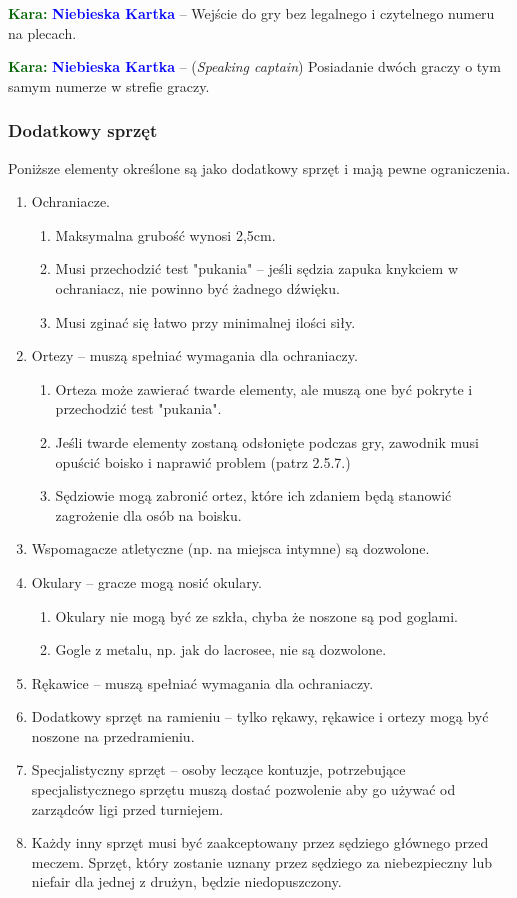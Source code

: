 \documentclass[11pt,a4paper]{article}
\newcommand\bluecard[1]{\bgroup\textcolor{darkgreen}{\textbf{Kara: }}\bgroup\textcolor{blue}{\textbf{Niebieska Kartka}} -- #1}
\begin{document}
\bluecard{Wejście do gry bez legalnego i czytelnego numeru na plecach.}

\bluecard{(\emph{Speaking captain}) Posiadanie dwóch graczy o tym samym numerze w strefie graczy.}

\subsubsection{Dodatkowy sprzęt}
Poniższe elementy określone są jako dodatkowy sprzęt i mają pewne ograniczenia.
\begin{enumerate}
  \item Ochraniacze.
  \begin{enumerate}
    \item Maksymalna grubość wynosi 2,5cm.
    \item Musi przechodzić test "pukania" -- jeśli sędzia zapuka knykciem w ochraniacz, nie powinno być żadnego dźwięku.
    \item Musi zginać się łatwo przy minimalnej ilości siły.
  \end{enumerate}
  \item Ortezy -- muszą spełniać wymagania dla ochraniaczy.
  \begin{enumerate}
    \item Orteza może zawierać twarde elementy, ale muszą one być pokryte i przechodzić test "pukania".
    \item Jeśli twarde elementy zostaną odsłonięte podczas gry, zawodnik musi opuścić boisko i naprawić problem (patrz 2.5.7.) %
    \item Sędziowie mogą zabronić ortez, które ich zdaniem będą stanowić zagrożenie dla osób na boisku.
  \end{enumerate}
  \item Wspomagacze atletyczne (np. na miejsca intymne) są dozwolone.
  \item Okulary -- gracze mogą nosić okulary.
  \begin{enumerate}
    \item Okulary nie mogą być ze szkła, chyba że noszone są pod goglami.
    \item Gogle z metalu, np. jak do lacrosee, nie są dozwolone.
  \end{enumerate}
  \item Rękawice -- muszą spełniać wymagania dla ochraniaczy.
  \item Dodatkowy sprzęt na ramieniu -- tylko rękawy, rękawice i ortezy mogą być noszone na przedramieniu.
  \item Specjalistyczny sprzęt -- osoby leczące kontuzje, potrzebujące specjalistycznego sprzętu muszą dostać pozwolenie aby go używać od zarządców ligi przed turniejem.
  \item Każdy inny sprzęt musi być zaakceptowany przez sędziego głównego przed meczem. Sprzęt, który zostanie uznany przez sędziego za niebezpieczny lub niefair dla jednej z drużyn, będzie niedopuszczony.
\end{enumerate}
\end{document}
